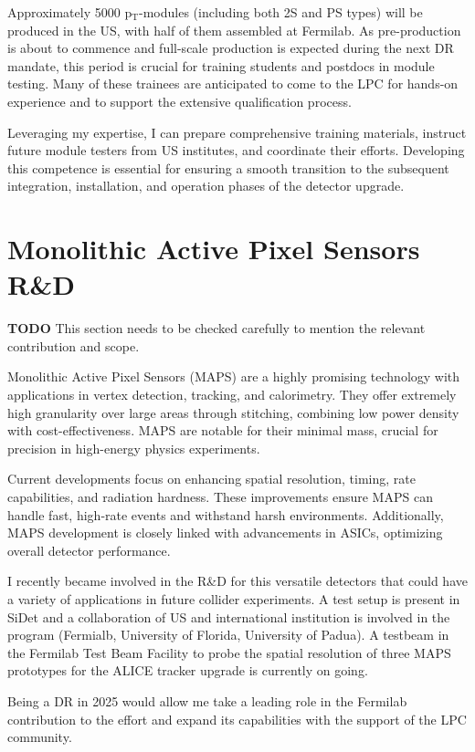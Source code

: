 {\begin{flushleft}
Approximately 5000 p$_{\mathrm{T}}$-modules (including both 2S and PS types) will be produced in the US, with half of them assembled at Fermilab. As pre-production is about to commence and full-scale production is expected during the next DR mandate, this period is crucial for training students and postdocs in module testing. Many of these trainees are anticipated to come to the LPC for hands-on experience and to support the extensive qualification process.

Leveraging my expertise, I can prepare comprehensive training materials, instruct future module testers from US institutes, and coordinate their efforts. Developing this competence is essential for ensuring a smooth transition to the subsequent integration, installation, and operation phases of the detector upgrade.

\vspace{\baselineskip}
\section{Monolithic Active Pixel Sensors R\&D}
{\bf TODO} This section needs to be checked carefully to mention the relevant contribution and scope.

Monolithic Active Pixel Sensors (MAPS) are a highly promising technology with applications in vertex detection, tracking, and calorimetry. They offer extremely high granularity over large areas through stitching, combining low power density with cost-effectiveness. MAPS are notable for their minimal mass, crucial for precision in high-energy physics experiments.

Current developments focus on enhancing spatial resolution, timing, rate capabilities, and radiation hardness. These improvements ensure MAPS can handle fast, high-rate events and withstand harsh environments. Additionally, MAPS development is closely linked with advancements in ASICs, optimizing overall detector performance.

I recently became involved in the R\&D for this versatile detectors that could have a variety of applications in future collider experiments. A test setup is present in SiDet and a collaboration of US and international institution is involved in the program (Fermialb, University of Florida, University of Padua). A testbeam in the Fermilab Test Beam Facility to probe the spatial resolution of three MAPS prototypes for the ALICE tracker upgrade is currently on going. 

Being a DR in 2025 would allow me take a leading role in the Fermilab contribution to the effort and expand its capabilities with the support of the LPC community.



\end{flushleft}}
